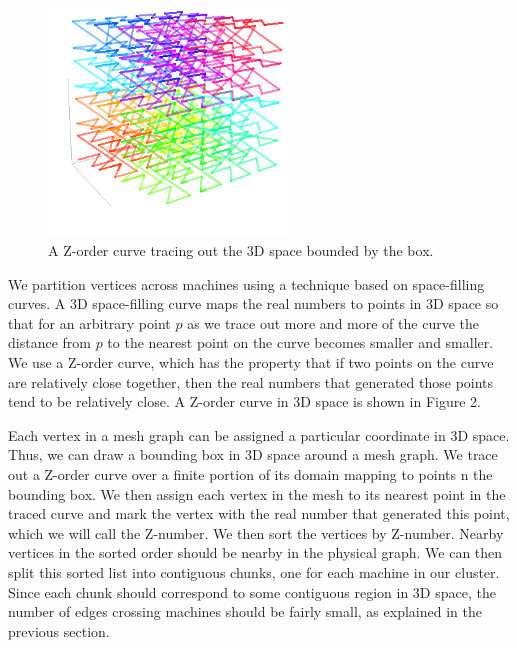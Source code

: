 \begin{figure}[!t]
\centering
\includegraphics[width=2.5in]{z}
\caption{A Z-order curve tracing out the 3D space bounded by the box.}
\label{fig_z}
\end{figure}

We partition vertices across machines using a technique 
based on space-filling curves. A 3D space-filling curve 
maps the real numbers to points in 3D space so that for 
an arbitrary point $p$ as we trace out more and more of 
the curve the distance from $p$ to the nearest point on 
the curve becomes smaller and smaller. We use a Z-order 
curve, which has the property that if two points on the 
curve are relatively close together, then the real numbers 
that generated those points tend to be relatively close. A 
Z-order curve in 3D space is shown in Figure 2.

Each vertex in a mesh graph can be assigned a particular 
coordinate in 3D space. Thus, we can draw a bounding box 
in 3D space around a mesh graph. We trace out a Z-order 
curve over a finite portion of its domain mapping to points 
n the bounding box. We then assign each vertex in the mesh 
to its nearest point in the traced curve and mark the vertex 
with the real number that generated this point, which we will 
call the Z-number. We then sort the vertices by Z-number. 
Nearby vertices in the sorted order should be nearby in the 
physical graph. We can then split this sorted list into 
contiguous chunks, one for each machine in our cluster. 
Since each chunk should correspond to some contiguous 
region in 3D space, the number of edges crossing machines 
should be fairly small, as explained in the previous section.
